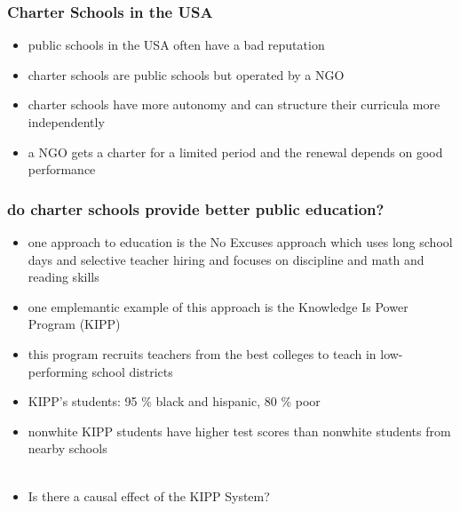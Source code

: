 \documentclass{beamer}
\begin{document}



\begin{frame}
\frametitle{Charter Schools in the USA}
	\begin{itemize}
		\item public schools in the USA often have a bad reputation
		\item charter schools are public schools but operated by a NGO
		\item charter schools have more autonomy and can structure their curricula more independently
		\item a NGO gets a charter for a limited period and the renewal depends on good performance
		
	\end{itemize}


\end{frame}

\begin{frame}
\frametitle{do charter schools provide better public education?}
\begin{itemize}
\item one approach to education is the No Excuses approach which uses long school days and selective teacher hiring and focuses on discipline and math and reading skills
		\item one emplemantic example of this approach is the Knowledge Is Power Program (KIPP)
		\item this program recruits teachers from the best colleges to teach in low-performing school districts
		\item KIPP's students: 95 \% black and hispanic, 80 \% poor
		\item nonwhite KIPP students have higher test scores than nonwhite students from nearby schools \\~\\
		
		\item Is there a causal effect of the KIPP System?
	\end{itemize}
\end{frame}
\end{document}
